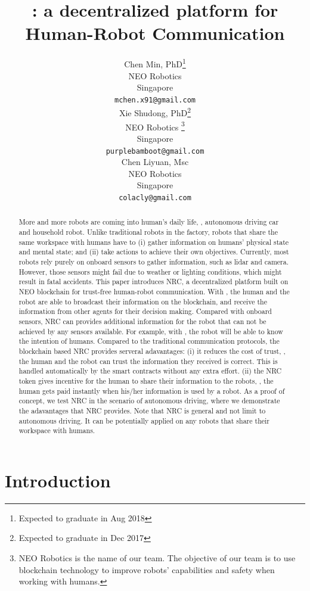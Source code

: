 \documentclass{article}
\title{\nrc: a decentralized platform for Human-Robot Communication}
\author{
  Chen Min, PhD\thanks{Expected to graduate in Aug 2018}\\
  NEO Robotics
  \\
  Singapore\\
  \texttt{mchen.x91@gmail.com} \\
  \And
  Xie Shudong, PhD\thanks{Expected to graduate in Dec 2017}\\
  NEO Robotics
  \thanks{NEO Robotics is the name of our team.
      The objective of our team is to use blockchain technology
      to improve robots' capabilities and safety when working 
      with humans.}
  \\
  Singapore\\
  \texttt{purplebamboot@gmail.com} \\
  \And
  Chen Liyuan, Msc\\
  NEO Robotics\\
  Singapore\\
  \texttt{colacly@gmail.com} \\
}
\begin{document}

\maketitle

\begin{abstract}
	
More and more robots are coming into human's daily life,
\eg, autonomous driving car and household robot.
Unlike traditional robots in the factory, robots that share the
same workspace with humans have to (i) gather information on humans'
physical state and mental state;
and (ii) take actions to achieve their own objectives.
Currently, most robots rely purely on onboard sensors to gather 
information, such as lidar and camera.
However, those sensors might fail due to weather or lighting
conditions, which might result in fatal accidents.
This paper introduces NRC, 
a decentralized platform built on NEO blockchain
for trust-free human-robot communication.
With \nrc, the human and the robot are able to broadcast their
information on the blockchain, and receive the 
information from other agents for their decision making.
Compared with onboard sensors, NRC can provides additional 
information for the robot that can not be achieved by 
any sensors available.
For example, with \nrc, the robot will be able to know the 
intention of humans.
Compared to the traditional communication protocols, 
the blockchain based
NRC provides serveral adavantages:
(i) it reduces the cost of trust, \ie, the human and the robot can trust
the information they received is correct. This is handled automatically
by the smart contracts without any extra effort.
(ii) the NRC token gives incentive for the human to share
their information to the robots, \ie, the human gets paid instantly
when his/her information is used by a robot.
As a proof of concept, we test NRC in the scenario of autonomous driving,
where we demonstrate the adavantages that NRC provides.
Note that NRC is general and not limit to autonomous driving. 
It can
be potentially applied on any robots that share their workspace
with humans.
 
\end{abstract}


\section{Introduction}
\end{document}
